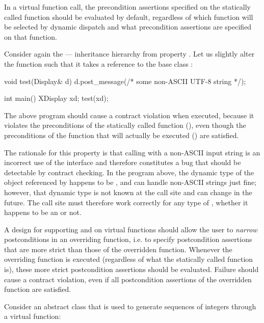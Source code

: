
In a virtual function call, the precondition assertions specified on the statically called function should be evaluated by default, regardless of which function will be selected by dynamic dispatch and what  precondition assertions are specified on that function.

Consider again the  ---  inheritance hierarchy from property . Let us slightly alter the  function such that it takes a reference to the base class :
\begin{codeblock}
void test(Display& d) {
  d.post_message(/* some non-ASCII UTF-8 string */);
}

int main() {
  XDisplay xd;
  test(xd);
}
\end{codeblock}
The above program should cause a contract violation when executed, because it violates the preconditions of the statically called function (), even though the preconditions of the function that will actually be executed () are satisfied.

The rationale for this property is that calling  with a non-ASCII input string is an incorrect use of the  interface and therefore constitutes a bug that should be detectable by contract checking. In the program above, the dynamic type of the object referenced by  happens to be , and  can handle non-ASCII strings just fine; however, that dynamic type is not known at the call site and can change in the future. The call site must therefore work correctly for any type of , whether it happens to be an  or not.



A design for supporting  and  on virtual functions should allow the user to \emph{narrow} postconditions in an overriding function, i.e. to specify postcondition assertions that are more strict than those of the overridden function. Whenever the overriding function is executed (regardless of what the statically called function is), these more strict postcondition assertions should be evaluated. Failure should cause a contract violation, even if all postcondition assertions of the overridden function are satisfied.

Consider an abstract class that is used to generate sequences of integers through a virtual function:

